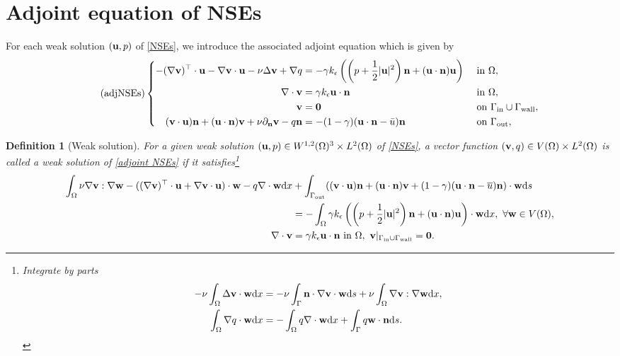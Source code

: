 \documentclass[oneside,11pt]{book}
\numberwithin{equation}{section}
\newtheorem{definition}{Definition}[section]
\begin{document}
\section{Adjoint equation of NSEs}
For each weak solution $({\bf u},p)$ of \eqref{NSEs}, we introduce the associated adjoint equation which is given by
\begin{equation}
    \label{adjoint NSEs}
    \tag{adjNSEs}
    \left\{\begin{split}
        -(\nabla{\bf v})^\top\cdot{\bf u} - \nabla{\bf v}\cdot{\bf u} - \nu\Delta{\bf v} + \nabla q &= -\gamma k_\epsilon\left(\left(p + \frac{1}{2}|{\bf u}|^2\right){\bf n} + ({\bf u}\cdot{\bf n}){\bf u}\right) &&\mbox{ in } \Omega,\\
        \nabla\cdot{\bf v} &= \gamma k_\epsilon{\bf u}\cdot{\bf n} &&\mbox{ in } \Omega,\\
        {\bf v} &= {\bf 0} &&\mbox{ on } \Gamma_{\rm in}\cup\Gamma_{\rm wall},\\
        ({\bf v}\cdot{\bf u}){\bf n} + ({\bf u}\cdot{\bf n}){\bf v} + \nu\partial_{\bf n}{\bf v} - q{\bf n} &= -(1 - \gamma)({\bf u}\cdot{\bf n} - \bar{u}){\bf n} &&\mbox{ on } \Gamma_{\rm out},
    \end{split}\right.    
\end{equation}

\begin{definition}[Weak solution]
    For a given weak solution $({\bf u},p)\in W^{1,2}(\Omega)^3\times L^2(\Omega)$ of \eqref{NSEs}, a vector function $({\bf v},q)\in V(\Omega)\times L^2(\Omega)$ is called a \emph{weak solution} of \eqref{adjoint NSEs} if it satisfies\footnote{Integrate by parts
        \begin{align}
            -\nu\int_\Omega \Delta{\bf v}\cdot{\bf w}{\rm d}x &= -\nu\int_\Gamma {\bf n}\cdot\nabla{\bf v}\cdot{\bf w}{\rm d}s + \nu\int_\Omega \nabla{\bf v}:\nabla{\bf w}{\rm d}x,\\
            \int_\Omega \nabla q\cdot{\bf w}{\rm d}x &= -\int_\Omega q\nabla\cdot{\bf w}{\rm d}x + \int_\Gamma q{\bf w}\cdot{\bf n}{\rm d}s.
    \end{align}}
    \begin{align}
        \label{weak formulation adjoint NSEs}
        \int_\Omega \nu\nabla{\bf v}:\nabla{\bf w} - ((\nabla{\bf v})^\top\cdot{\bf u} + \nabla{\bf v}\cdot{\bf u})\cdot{\bf w}  - q\nabla\cdot{\bf w}{\rm d}x &+ \int_{\Gamma_{\rm out}} (({\bf v}\cdot{\bf u}){\bf n} + ({\bf u}\cdot{\bf n}){\bf v} + (1 - \gamma)({\bf u}\cdot{\bf n} - \overline{u}){\bf n})\cdot{\bf w}{\rm d}s\\
        &= -\int_\Omega \gamma k_\epsilon\left(\left(p + \frac{1}{2}|{\bf u}|^2\right){\bf n} + ({\bf u}\cdot{\bf n}){\bf u}\right)\cdot{\bf w}{\rm d}x,\ \forall{\bf w}\in V(\Omega),\\
        \nabla\cdot{\bf v} &= \gamma k_\epsilon{\bf u}\cdot{\bf n} \mbox{ in } \Omega,\ {\bf v}|_{\Gamma_{\rm in}\cup\Gamma_{\rm wall}} = {\bf 0}.
    \end{align}
\end{definition}
\end{document}
